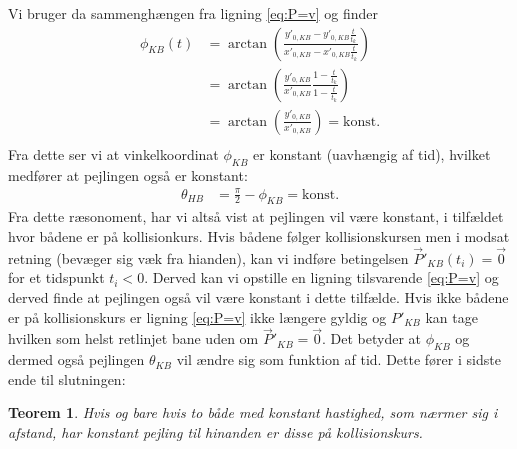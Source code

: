 \documentclass[%
 reprint,
nofootinbib,
aps,
]{revtex4-1}
\newtheorem{theorem}{Teorem}
\begin{document}
Vi bruger da sammenghængen fra ligning \ref{eq:P=v} og finder
\begin{align*}
  \phi_{KB}(t) &= \arctan{\left( \frac{y'_{0,KB} - y'_{0,KB}\frac{t}{t_k}}{x'_{0,KB} - x'_{0,KB}\frac{t}{t_k}}\right)} \\
  &= \arctan{\left(\frac{y'_{0,KB}}{x'_{0,KB}} \frac{1 - \frac{t}{t_k}}{1 - \frac{t}{t_k}}\right)} \\
  &= \arctan{\left(\frac{y'_{0,KB}}{x'_{0,KB}}\right)} = \text{konst.} \\
\end{align*}
Fra dette ser vi at vinkelkoordinat $\phi_{KB}$ er konstant (uavhængig af tid), hvilket medfører at pejlingen også er konstant:
\begin{align*}
  \theta_{HB} &= \frac{\pi}{2} - \phi_{KB} = \text{konst.}
\end{align*}
Fra dette ræsonoment, har vi altså vist at pejlingen vil være konstant, i tilfældet hvor bådene er på kollisionkurs. Hvis bådene følger kollisionskursen men i modsat retning (bevæger sig væk fra hianden), kan vi indføre betingelsen $\vec{P}'_{KB}(t_i) = \vec{0}$ for et tidspunkt $t_i < 0$. Derved kan vi opstille en ligning tilsvarende \ref{eq:P=v} og derved finde at pejlingen også vil være konstant i dette tilfælde. Hvis ikke bådene er på kollisionskurs er ligning \ref{eq:P=v} ikke længere gyldig og $P'_{KB}$ kan tage hvilken som helst retlinjet bane uden om $\vec{P}'_{KB} = \vec{0}$. Det betyder at $\phi_{KB}$ og dermed også pejlingen $\theta_{KB}$ vil ændre sig som funktion af tid. Dette fører i sidste ende til slutningen:
\begin{theorem}
  Hvis og bare hvis to både med konstant hastighed, som nærmer sig i afstand, har konstant pejling til hinanden er disse på kollisionskurs.
  \label{Teo:pejling}
\end{theorem}
\end{document}
